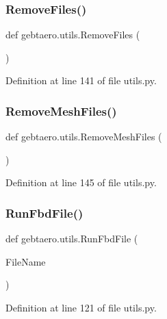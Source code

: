 \subsubsection{\texorpdfstring{Remove\+Files()}{RemoveFiles()}}
{\footnotesize\ttfamily def gebtaero.\+utils.\+Remove\+Files (\begin{DoxyParamCaption}{ }\end{DoxyParamCaption})}



Definition at line 141 of file utils.\+py.

\mbox{\label{namespacegebtaero_1_1utils_a8f7dd7932f9ad411a1b153e1e17a4c62}} 
\subsubsection{\texorpdfstring{Remove\+Mesh\+Files()}{RemoveMeshFiles()}}
{\footnotesize\ttfamily def gebtaero.\+utils.\+Remove\+Mesh\+Files (\begin{DoxyParamCaption}{ }\end{DoxyParamCaption})}



Definition at line 145 of file utils.\+py.

\mbox{\label{namespacegebtaero_1_1utils_a37d973efabdd0beca6418265ffa57d32}} 
\subsubsection{\texorpdfstring{Run\+Fbd\+File()}{RunFbdFile()}}
{\footnotesize\ttfamily def gebtaero.\+utils.\+Run\+Fbd\+File (\begin{DoxyParamCaption}\item[{}]{File\+Name }\end{DoxyParamCaption})}



Definition at line 121 of file utils.\+py.

\mbox{\label{namespacegebtaero_1_1utils_a553253bef10c3bec37dc0d858b03dc71}} 
